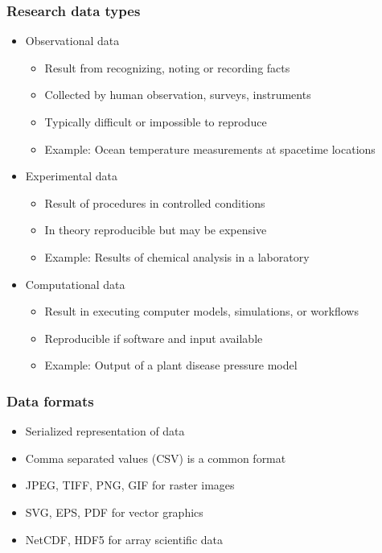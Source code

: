 \documentclass{beamer}
\begin{document}
\begin{frame}
  \frametitle{Research data types}
  
  \begin{itemize}
  \item Observational data
  \begin{itemize}
    \item Result from recognizing, noting or recording facts
    \item Collected by human observation, surveys, instruments
    \item Typically difficult or impossible to reproduce
    \item Example: Ocean temperature measurements at spacetime locations
  \end{itemize}
  \item Experimental data
  \begin{itemize}
    \item Result of procedures in controlled conditions
    \item In theory reproducible but may be expensive
    \item Example: Results of chemical analysis in a laboratory
  \end{itemize}
  \item Computational data
  \begin{itemize}
    \item Result in executing computer models, simulations, or workflows
    \item Reproducible if software and input available
    \item Example: Output of a plant disease pressure model
  \end{itemize}
  \end{itemize}
\end{frame}


\begin{frame}
  \frametitle{Data formats}
  
  \begin{itemize}
  \item Serialized representation of data
  \item Comma separated values (CSV) is a common format
  \item JPEG, TIFF, PNG, GIF for raster images
  \item SVG, EPS, PDF for vector graphics
  \item NetCDF, HDF5 for array scientific data
  \end{itemize}
\end{frame}
\end{document}
